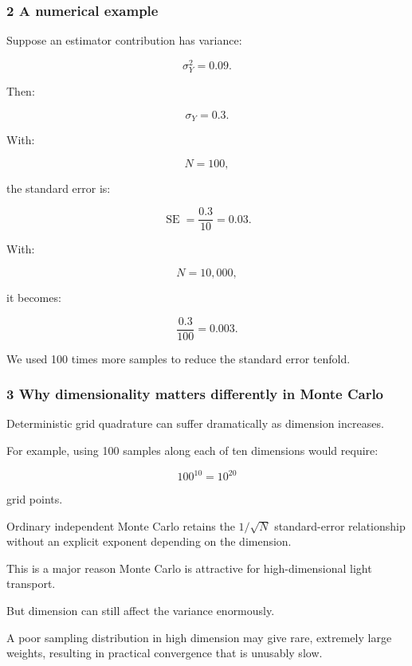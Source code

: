 \subsubsection{2 A numerical example}\label{02-foundations-ii-ch030-a-numerical-example}

\hypertarget{02-foundations-ii-ch030-a-numerical-example}{}

Suppose an estimator contribution has variance:

\[
 \sigma_Y^2=0.09.
\]

Then:

\[
 \sigma_Y=0.3.
\]

With:

\[
 N=100,
\]

the standard error is:

\[
 \operatorname{SE} = \frac{0.3}{10} =\boxed{0.03}.
\]

With:

\[
 N=10{,}000,
\]

it becomes:

\[
 \frac{0.3}{100} =\boxed{0.003}.
\]

We used 100 times more samples to reduce the standard error tenfold.

\subsubsection{3 Why dimensionality matters differently in Monte Carlo}\label{02-foundations-ii-ch030-why-dimensionality-matters-differently-in-monte-carlo}

\hypertarget{02-foundations-ii-ch030-why-dimensionality-matters-differently-in-monte-carlo}{}

Deterministic grid quadrature can suffer dramatically as dimension increases.

For example, using 100 samples along each of ten dimensions would require:

\[
 100^{10}=10^{20}
\]

grid points.

Ordinary independent Monte Carlo retains the \(1/\sqrt N\) standard-error relationship without an explicit exponent depending on the dimension.

This is a major reason Monte Carlo is attractive for high-dimensional light transport.

But dimension can still affect the variance enormously.

A poor sampling distribution in high dimension may give rare, extremely large weights, resulting in practical convergence that is unusably slow.

